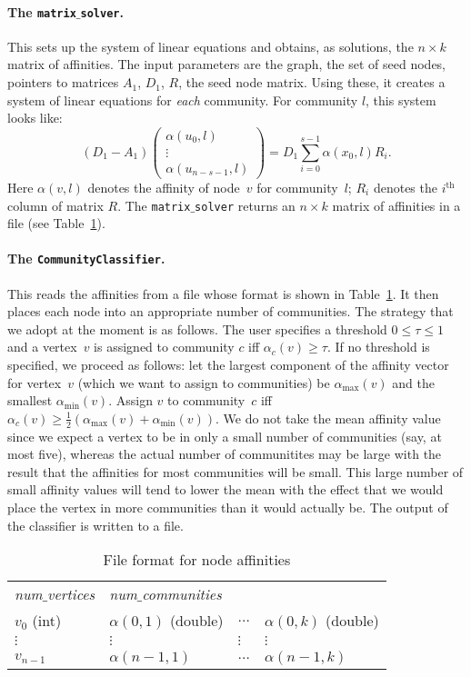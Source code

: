 \documentclass[12pt]{article}
\renewcommand{\th}{\ensuremath{^{\mathrm{th}}}}
\begin{document}
\paragraph{The \texttt{matrix$\_$solver}.} This sets up the system of 
linear equations and obtains, as solutions, the $n \times k$ matrix 
of affinities. The input parameters are the graph, the set of seed nodes, 
pointers to matrices $A_1$, $D_1$, $R$, the seed node matrix. Using these, 
it creates a system of linear equations for \emph{each} community.   
For community $l$, this system looks like:
\[
	(D_1 -  A_1) \begin{pmatrix} \alpha(u_0, l) \\ \vdots \\ \alpha(u_{n - s -1}, l) \end{pmatrix}	
		= D_1 \sum_{i = 0}^{s - 1} \alpha(x_0, l) R_i. 
\] 
Here $\alpha(v, l)$ denotes the affinity of node~$v$ for community~$l$; $R_i$ 
denotes the $i\th$ column of matrix $R$. The \texttt{matrix$\_$solver} returns 
an $n \times k$ matrix of affinities in a file (see Table~\ref{tab:node_aff}).

\paragraph{The \texttt{CommunityClassifier}.} This reads the affinities 
from a file whose format is shown in Table~\ref{tab:node_aff}.
It then places each node into an appropriate number of communities. 
The strategy that we adopt at the moment is as follows. The user 
specifies a threshold $0 \leq \tau \leq 1$ and a vertex~$v$ is assigned 
to community $c$ iff $\alpha_c(v) \geq \tau$. If no threshold is specified, 
we proceed as follows: let the largest component of the affinity vector 
for vertex~$v$ (which 
we want to assign to communities) be $\alpha_{\max}(v)$ and the smallest 
$\alpha_{\min}(v)$. Assign $v$ to community~$c$ iff 
$\alpha_c(v) \geq \frac{1}{2}(\alpha_{\max}(v) + \alpha_{\min}(v))$.
We do not take the mean affinity value since we expect a vertex 
to be in only a small number of communities (say, at most five), whereas
the actual number of communitites may be large with the result that 
the affinities for most communities will be small. This large number 
of small affinity values will tend to lower the mean with the effect that
we would place the vertex in more communities than it would actually be.
The output of the classifier is written to a file.

\begin{table}[ht]
\centering
\begin{tabular}{llll}
\emph{num$\_$vertices} & \emph{num$\_$communities} &  & \\
$v_0$ (int)              & $\alpha(0, 1)$ (double) & $\ldots$ & $\alpha(0, k)$ (double) \\
$\vdots$ & $\vdots$ & $\vdots$ & $\vdots$ \\
$v_{n-1}$  & $\alpha(n-1, 1)$ & $\ldots$ & $\alpha(n-1, k)$ 
\end{tabular}
\caption{File format for node affinities}\label{tab:node_aff}
\end{table}
%
\end{document}

